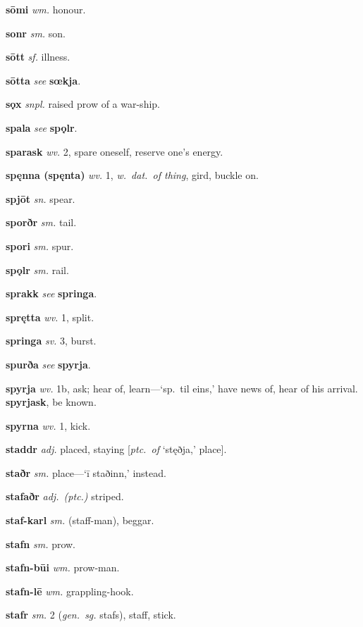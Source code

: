 \documentclass[12pt,letterpaper]{book}
\begin{document}
\noindent
\textbf{sōmi} \textit{wm.} honour.

\noindent
\textbf{sonr} \textit{sm.} son.

\noindent
\textbf{sōtt} \textit{sf.} illness.

\noindent
\textbf{sōtta} \textit{} \textit{see} \textbf{sœkja}.

\noindent
\textbf{sǫx} \textit{snpl.} raised prow of a war-ship.

\noindent
\textbf{spala} \textit{} \textit{see} \textbf{spǫlr}.

\noindent
\textbf{sparask} \textit{wv.} 2, spare oneself, reserve one's energy.

\noindent
\textbf{spęnna (spęnta)} \textit{wv.} 1, \textit{w.\ dat.\ of thing}, gird,
	buckle on.

\noindent
\textbf{spjōt} \textit{sn.} spear.

\noindent
\textbf{sporðr} \textit{sm.} tail.

\noindent
\textbf{spori} \textit{sm.} spur.

\noindent
\textbf{spǫlr} \textit{sm.} rail.

\noindent
\textbf{sprakk} \textit{} \textit{see} \textbf{springa}.

\noindent
\textbf{sprętta} \textit{wv.} 1, split.

\noindent
\textbf{springa} \textit{sv.} 3, burst.

\noindent
\textbf{spurða} \textit{} \textit{see} \textbf{spyrja}.

\noindent
\textbf{spyrja} \textit{wv.} 1b, ask; hear of, learn---`sp.\ til eins,' have
	news of, hear of his arrival.  \textbf{spyrjask}, be known.

\noindent
\textbf{spyrna} \textit{wv.} 1, kick.

\noindent
\textbf{staddr} \textit{adj.} placed, staying [\textit{ptc.\ of} `stęðja,'
	place].

\noindent
\textbf{staðr} \textit{sm.} place---`ī staðinn,' instead.

\noindent
\textbf{stafaðr} \textit{adj.\ (ptc.)} striped.

\noindent
\textbf{staf-karl} \textit{sm.} (staff-man), beggar.

\noindent
\textbf{stafn} \textit{sm.} prow.

\noindent
\textbf{stafn-būi} \textit{wm.} prow-man.

\noindent
\textbf{stafn-lē} \textit{wm.} grappling-hook.

\noindent
\textbf{stafr} \textit{sm.} 2 (\textit{gen.\ sg.} stafs), staff, stick.
\end{document}
